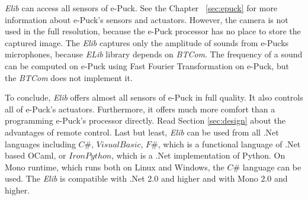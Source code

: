   {\it Elib} can access all sensors of e-Puck. See the Chapter ~\ref{sec:epuck} 
  for more information about e-Puck's sensors and actuators.
  However, the camera is not used in the full resolution,
  because the e-Puck processor has no place to store the captured image.
  The {\it Elib} captures only the amplitude of sounds from e-Pucks microphones,
  because {\it ELib} library depends on {\it BTCom}.
  The frequency of a sound can be computed on e-Puck
  using Fast Fourier Transformation on e-Puck, 
  but the {\it BTCom} does not implement it.

  To conclude, {\it Elib} offers almost all sensors of e-Puck in full quality. 
  It also controls all of e-Puck's actuators.
  Furthermore, it offers much more comfort than a programming e-Puck's processor directly. 
  Read Section \ref{sec:design} about the advantages
  of remote control. 
  Last but least, {\it Elib} can be used from all .Net languages 
  including $C\#$, $Visual Basic$, $F\#$,
  which is a functional language of .Net based OCaml,
  or $Iron Python$, which is a .Net implementation of Python. On Mono runtime, 
  which runs both on Linux and Windows, the $C\#$ language can be used.
  The {\it Elib} is compatible with .Net 2.0 \cite{net} and higher 
  and with Mono \cite{mono} 2.0 and higher.

